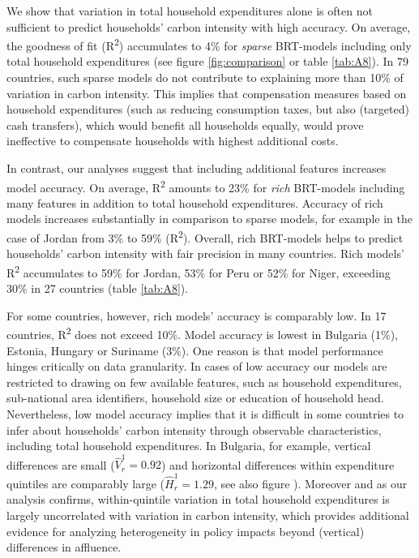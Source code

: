 \documentclass[12pt, a4paper]{article}
\begin{document}
We show that variation in total household expenditures alone is often not sufficient to predict households' carbon intensity with high accuracy. On average, the goodness of fit (R\textsuperscript{2}) accumulates to 4\% for \textit{sparse} BRT-models including only total household expenditures (see figure \ref{fig:comparison} or table \ref{tab:A8}). In 79 countries, such sparse models do not contribute to explaining more than 10\% of variation in carbon intensity. This implies that compensation measures based on household expenditures (such as reducing consumption taxes, but also (targeted) cash transfers), which would benefit all households equally, would prove ineffective to compensate households with highest additional costs.

In contrast, our analyses suggest that including additional features increases model accuracy. On average, R\textsuperscript{2} amounts to 23\% for \textit{rich} BRT-models including many features in addition to total household expenditures. Accuracy of rich models increases substantially in comparison to sparse models, for example in the case of Jordan from 3\% to 59\% (R\textsuperscript{2}). Overall, rich BRT-models helps to predict households' carbon intensity with fair precision in many countries. Rich models' R\textsuperscript{2} accumulates to 59\% for Jordan, 53\% for Peru or 52\% for Niger, exceeding 30\% in 27 countries (table \ref{tab:A8}).

For some countries, however, rich models' accuracy is comparably low. In 17 countries, R\textsuperscript{2} does not exceed 10\%. Model accuracy is lowest in Bulgaria (1\%), Estonia, Hungary or Suriname (3\%). One reason is that model performance hinges critically on data granularity. In cases of low accuracy our models are restricted to drawing on few available features, such as household expenditures, sub-national area identifiers, household size or education of household head. Nevertheless, low model accuracy implies that it is difficult in some countries to infer about households' carbon intensity through observable characteristics, including total household expenditures. In Bulgaria, for example, vertical differences are small ($\widehat{V}_{r}^{1}=0.92$) and horizontal differences within expenditure quintiles are comparably large ($\widehat{H}_{r}^{1}=1.29$, see also figure ). Moreover and as our analysis confirms, within-quintile variation in total household expenditures is largely uncorrelated with variation in carbon intensity, which provides additional evidence for analyzing heterogeneity in policy impacts beyond (vertical) differences in affluence.
\end{document}
